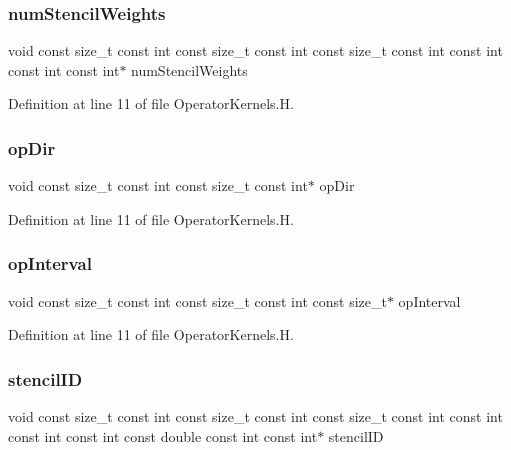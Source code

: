 \subsubsection{\texorpdfstring{num\+Stencil\+Weights}{numStencilWeights}}
{\footnotesize\ttfamily void const size\+\_\+t const int const size\+\_\+t const int const size\+\_\+t const int const int const int const int$\ast$ num\+Stencil\+Weights}



Definition at line 11 of file Operator\+Kernels.\+H.

\hypertarget{OperatorKernels_8H_afc6f027cdb36bf6d86e573c2083e555b}{}\label{OperatorKernels_8H_afc6f027cdb36bf6d86e573c2083e555b} 
\subsubsection{\texorpdfstring{op\+Dir}{opDir}}
{\footnotesize\ttfamily void const size\+\_\+t const int const size\+\_\+t const int$\ast$ op\+Dir}



Definition at line 11 of file Operator\+Kernels.\+H.

\hypertarget{OperatorKernels_8H_a136da8181293f91e3040a5e6126d2ef6}{}\label{OperatorKernels_8H_a136da8181293f91e3040a5e6126d2ef6} 
\subsubsection{\texorpdfstring{op\+Interval}{opInterval}}
{\footnotesize\ttfamily void const size\+\_\+t const int const size\+\_\+t const int const size\+\_\+t$\ast$ op\+Interval}



Definition at line 11 of file Operator\+Kernels.\+H.

\hypertarget{OperatorKernels_8H_a681701e0402fff5dd66637c1c99e34aa}{}\label{OperatorKernels_8H_a681701e0402fff5dd66637c1c99e34aa} 
\subsubsection{\texorpdfstring{stencil\+ID}{stencilID}}
{\footnotesize\ttfamily void const size\+\_\+t const int const size\+\_\+t const int const size\+\_\+t const int const int const int const int const double const int const int$\ast$ stencil\+ID}



